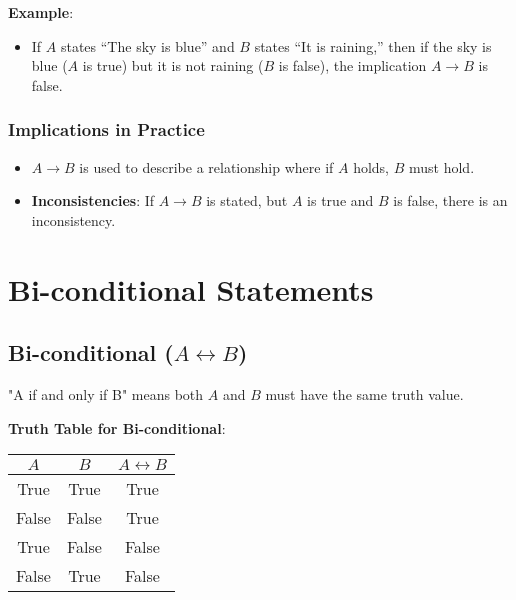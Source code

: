 \documentclass{article}
\begin{document}
\textbf{Example}:
\begin{itemize}
    \item If $A$ states “The sky is blue” and $B$ states “It is raining,” then if the sky is blue ($A$ is true) but it is not raining ($B$ is false), the implication $A \rightarrow B$ is false.
\end{itemize}

\subsubsection{Implications in Practice}
\begin{itemize}
    \item $A \rightarrow B$ is used to describe a relationship where if $A$ holds, $B$ must hold.
    \item \textbf{Inconsistencies}: If $A \rightarrow B$ is stated, but $A$ is true and $B$ is false, there is an inconsistency.
\end{itemize}

\section{Bi-conditional Statements}

\subsection{Bi-conditional ($A \leftrightarrow B$)}
"A if and only if B" means both $A$ and $B$ must have the same truth value.

\textbf{Truth Table for Bi-conditional}:
\begin{center}
    \begin{tabular}{|c|c|c|}
        \hline
        $A$ & $B$ & $A \leftrightarrow B$ \\
        \hline
        True & True & True \\
        False & False & True \\
        True & False & False \\
        False & True & False \\
        \hline
    \end{tabular}
\end{center}
\end{document}

